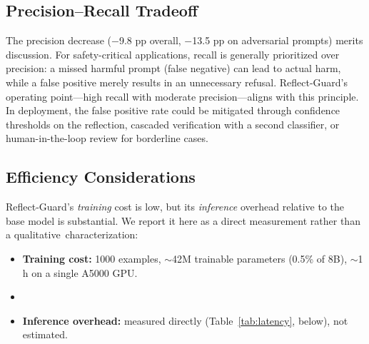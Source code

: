 \documentclass[superintelligence,article,accept,moreauthors]{Definitions/mdpi}
\renewcommand{\hl}[1]{#1}
\begin{document}
\subsection{Precision--Recall Tradeoff}

The precision decrease ($-$9.8 pp overall, $-$13.5 pp on adversarial prompts) merits discussion. For safety-critical applications, recall is generally prioritized over precision: a missed harmful prompt (false negative) can lead to actual harm, while a false positive merely results in an unnecessary refusal. Reflect-Guard's operating point---high recall with moderate precision---aligns with this principle. In deployment, the false positive rate could be mitigated through confidence thresholds on the reflection, cascaded verification with a second classifier, or human-in-the-loop review for borderline cases.

\subsection{Efficiency Considerations}
\label{sec:efficiency}

Reflect-Guard's \emph{\hl{training} %
} cost is low, but its \emph{inference} overhead relative to the base model is substantial. We report it here as a direct measurement rather than a \mbox{qualitative characterization:}
\begin{itemize}[leftmargin=*, nosep]
  \item \textbf{\hl{Training cost:} %
} 1000 examples, $\sim$42M trainable parameters (0.5\% of 8B), $\sim$1 h on a single A5000 GPU.
  \item {}
  \item \textbf{Inference overhead:} measured directly (Table~\ref{tab:latency}, below), not estimated.
\end{itemize}
\end{document}

